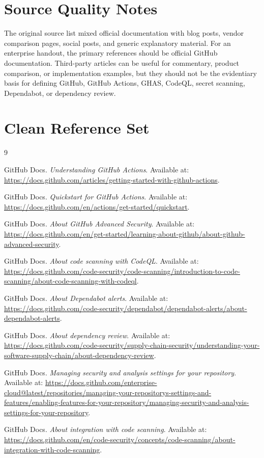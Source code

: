 \documentclass[11pt]{article}
\begin{document}
\section{Source Quality Notes}

The original source list mixed official documentation with blog posts, vendor comparison pages, social posts, and generic explanatory material. For an enterprise handout, the primary references should be official GitHub documentation. Third-party articles can be useful for commentary, product comparison, or implementation examples, but they should not be the evidentiary basis for defining GitHub, GitHub Actions, GHAS, CodeQL, secret scanning, Dependabot, or dependency review.

\section{Clean Reference Set}

{\small
\begin{thebibliography}{9}
\raggedright

GitHub Docs. \textit{Understanding GitHub Actions}. Available at: \url{https://docs.github.com/articles/getting-started-with-github-actions}.

GitHub Docs. \textit{Quickstart for GitHub Actions}. Available at: \url{https://docs.github.com/en/actions/get-started/quickstart}.

GitHub Docs. \textit{About GitHub Advanced Security}. Available at: \url{https://docs.github.com/en/get-started/learning-about-github/about-github-advanced-security}.

GitHub Docs. \textit{About code scanning with CodeQL}. Available at: \url{https://docs.github.com/code-security/code-scanning/introduction-to-code-scanning/about-code-scanning-with-codeql}.

GitHub Docs. \textit{About Dependabot alerts}. Available at: \url{https://docs.github.com/code-security/dependabot/dependabot-alerts/about-dependabot-alerts}.

GitHub Docs. \textit{About dependency review}. Available at: \url{https://docs.github.com/code-security/supply-chain-security/understanding-your-software-supply-chain/about-dependency-review}.

GitHub Docs. \textit{Managing security and analysis settings for your repository}. Available at: \url{https://docs.github.com/enterprise-cloud@latest/repositories/managing-your-repositorys-settings-and-features/enabling-features-for-your-repository/managing-security-and-analysis-settings-for-your-repository}.

GitHub Docs. \textit{About integration with code scanning}. Available at: \url{https://docs.github.com/en/code-security/concepts/code-scanning/about-integration-with-code-scanning}.

\end{thebibliography}
}
\end{document}

